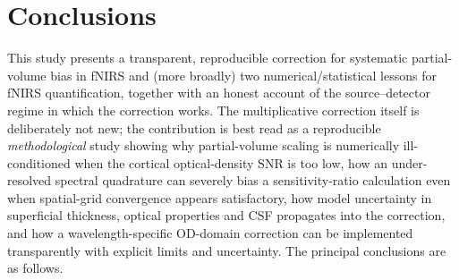 \documentclass[11pt]{article}
\begin{document}
\section{Conclusions}

This study presents a transparent, reproducible correction for systematic partial-volume bias in fNIRS and (more broadly) two numerical/statistical lessons for fNIRS quantification, together with an honest account of the source--detector regime in which the correction works. The multiplicative correction itself is deliberately not new; the contribution is best read as a reproducible \emph{methodological} study showing why partial-volume scaling is numerically ill-conditioned when the cortical optical-density SNR is too low, how an under-resolved spectral quadrature can severely bias a sensitivity-ratio calculation even when spatial-grid convergence appears satisfactory, how model uncertainty in superficial thickness, optical properties and CSF propagates into the correction, and how a wavelength-specific OD-domain correction can be implemented transparently with explicit limits and uncertainty. The principal conclusions are as follows.
\end{document}
